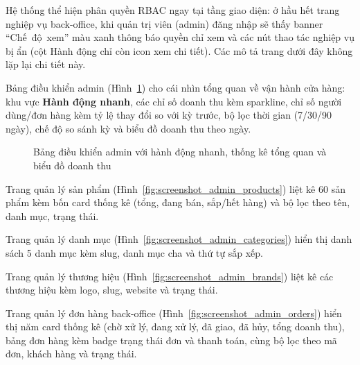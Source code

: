 Hệ thống thể hiện phân quyền RBAC ngay tại tầng giao diện: ở hầu hết trang nghiệp vụ back-office, khi quản trị viên (admin) đăng nhập sẽ thấy banner \mbox{``Chế độ xem''} màu xanh thông báo quyền chỉ xem và các nút thao tác nghiệp vụ bị ẩn (cột Hành động chỉ còn icon xem chi tiết). Các mô tả trang dưới đây không lặp lại chi tiết này.

Bảng điều khiển admin (Hình~\ref{fig:screenshot_admin_dashboard}) cho cái nhìn tổng quan về vận hành cửa hàng: khu vực \textbf{Hành động nhanh}, các chỉ số doanh thu kèm sparkline, chỉ số người dùng/đơn hàng kèm tỷ lệ thay đổi so với kỳ trước, bộ lọc thời gian (7/30/90 ngày), chế độ so sánh kỳ và biểu đồ doanh thu theo ngày.

\begin{figure}[H]
  \centering
  \caption{Bảng điều khiển admin với hành động nhanh, thống kê tổng quan và biểu đồ doanh thu}
  \label{fig:screenshot_admin_dashboard}
\end{figure}

Trang quản lý sản phẩm (Hình~\ref{fig:screenshot_admin_products}) liệt kê 60 sản phẩm kèm bốn card thống kê (tổng, đang bán, sắp/hết hàng) và bộ lọc theo tên, danh mục, trạng thái.

Trang quản lý danh mục (Hình~\ref{fig:screenshot_admin_categories}) hiển thị danh sách 5 danh mục kèm slug, danh mục cha và thứ tự sắp xếp.

Trang quản lý thương hiệu (Hình~\ref{fig:screenshot_admin_brands}) liệt kê các thương hiệu kèm logo, slug, website và trạng thái.

Trang quản lý đơn hàng back-office (Hình~\ref{fig:screenshot_admin_orders}) hiển thị năm card thống kê (chờ xử lý, đang xử lý, đã giao, đã hủy, tổng doanh thu), bảng đơn hàng kèm badge trạng thái đơn và thanh toán, cùng bộ lọc theo mã đơn, khách hàng và trạng thái.

